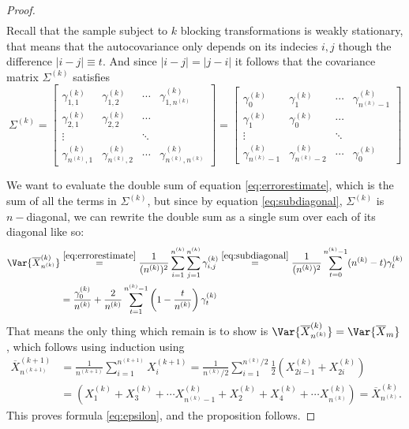 \documentclass[11pt,english,a4paper]{article}
\begin{document}
\begin{proof}
\begin{align}
\end{align}
Recall that the sample subject to $k$ blocking transformations is weakly stationary, that means that the autocovariance only depends on its indecies $i,j$ though the difference $|i-j| \equiv t$. And since $|i-j| = |j-i|$ it follows that the covariance matrix $\Sigma^{(k)}$ satisfies
\begin{equation}
\Sigma^{(k)} = \begin{bmatrix}
\gamma^{(k)}_{1,1} & \gamma^{(k)}_{1,2} & \cdots & \gamma^{(k)}_{1,n^{(k)}} \\
\gamma^{(k)}_{2,1} & \gamma^{(k)}_{2,2} & \cdots &  \\
\vdots & & \ddots \\
\gamma^{(k)}_{n^{(k)},1} & \gamma^{(k)}_{n^{(k)},2} & \cdots & \gamma^{(k)}_{n^{(k)},n^{(k)}}
\end{bmatrix} = 
\begin{bmatrix}
\gamma^{(k)}_{0} & \gamma^{(k)}_{1} & \cdots & \gamma^{(k)}_{n^{(k)}-1} \\
\gamma^{(k)}_{1} & \gamma^{(k)}_{0} & \cdots &  \\
\vdots & & \ddots \\
\gamma^{(k)}_{n^{(k)}-1} & \gamma^{(k)}_{n^{(k)}-2} & \cdots & \gamma^{(k)}_{0}
\end{bmatrix} \label{eq:subdiagonal}
\end{equation}

We want to evaluate the double sum of equation \eqref{eq:errorestimate}, which is the 
sum of all the terms in $\Sigma^{(k)}$, but since by equation \eqref{eq:subdiagonal}, $\Sigma^{(k)}$ is $n-$diagonal, we can rewrite the double sum as a single sum over each of its diagonal like so:
\begin{align*}
\Var{\overline{X}^{(k)}_{n^{(k)}}} &\stackrel{\eqref{eq:errorestimate} }{=} \frac{1}{(n^{(k)})^2} \sum_{i=1}^{n^{(k)}} \sum_{j=1}^{n^{(k)}} \gamma_{i,j}^{(k)}  \stackrel{\eqref{eq:subdiagonal} }{=} \frac{1}{(n^{(k)})^2} \sum_{t=0}^{n^{(k)} - 1}  (n^{(k)} - t) \gamma_{t}^{(k)} \\
&= \frac{\gamma_0^{(k)}}{n^{(k)}} + \frac{2}{n^{(k)}} \sum_{t=1}^{n^{(k)} - 1} \left( 1 - \frac{t}{n^{(k)}} \right)\gamma^{(k)}_t
\end{align*}
That means the only thing which remain is to show is $\Var{\overline{X}^{(k)}_{n^{(k)}}} = \Var{\overline{X}_{m}}$, which follows using induction using
\begin{align*}
\overline{X}^{(k+1)}_{n^{(k+1)}} &= \frac{1}{n^{(k+1)}} \sum_{i=1}^{n^{(k+1)}}X_i^{(k+1)} = \frac{1}{n^{(k)}/2} \sum_{i=1}^{n^{(k)}/2} \frac{1}{2} \left( X^{(k)}_{2i-1} + X^{(k)}_{2i} \right) \\
&= \left( X_1^{(k)} + X_3^{(k)} + \cdots X_{n^{(k)} - 1}^{(k)} + X_2^{(k)} + X_4^{(k)} + \cdots X_{n^{(k)}}^{(k)} \right) = \overline{X}^{(k)}_{n^{(k)}}.
\end{align*}
This proves formula \eqref{eq:epsilon}, and the proposition follows.
\end{proof}
\end{document}
